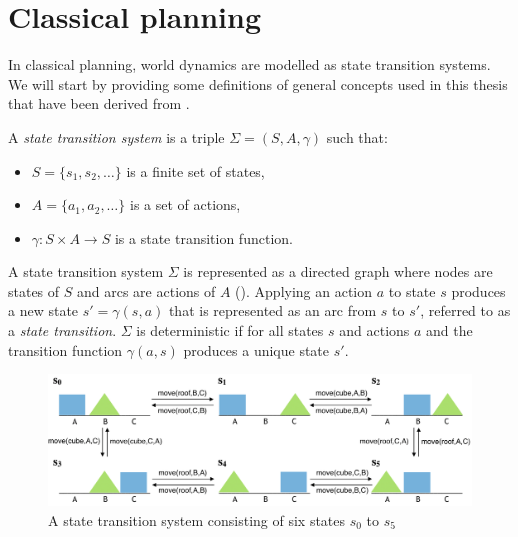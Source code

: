 \section{Classical planning}\label{subsec:Classical planning problem}
In classical planning, world dynamics are modelled as state transition systems. 
We will start by providing some definitions of general concepts used in this thesis that have been derived from \cite{ghallab2004automated}.


\begin{definition}
A \textit{state transition system} is a triple $\Sigma = (S, A, \gamma)$ such that:
\begin{itemize}
\item $S=\{s_1, s_2, \dots \}$ is a finite set of states,
\item $A=\{a_1, a_2, \dots \}$ is a set of actions,
\item $\gamma : S \times A \rightarrow S$ is a state transition function.
\end{itemize}
\end{definition}
\noindent
A state transition system $\Sigma$ is represented as a directed graph where nodes are states of $S$ and arcs are actions of $A$ (). 
Applying an action $a$ to state $s$ produces a new state $s'= \gamma(s,a)$ that is represented as an arc from $s$ to $s'$, referred to as a  \textit{state transition}.
$\Sigma$ is deterministic if for all states $s$ and actions $a$ and the transition function $\gamma(a, s)$ produces a unique state $s'$. 

\begin{figure}[ht]
	\centering
	\includegraphics[width=\linewidth]{figures/state-transition-system}
	\caption{A state transition system consisting of six states $s_0$ to $s_5$  %
	}
	\label{fig:state-transition-system}
\end{figure}

